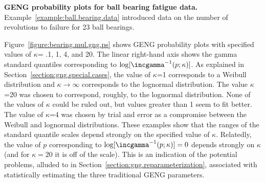 \begin{example} 
\label{example:bearing.gng.plot.compare}
{\bf GENG
probability plots for ball bearing fatigue data.} 
Example~\ref{example:ball.bearing.data} introduced data on the number of
revolutions to failure for 23 ball bearings.
\begin{sidewaysfigure}
\caption{GENG probability plots of the ball bearing
fatigue data with specified $\kappa$=
.1, 1, 4, and 20.}
\label{figure:bearing.mul.gng.ps}
\end{sidewaysfigure}
Figure~\ref{figure:bearing.mul.gng.ps} shows GENG
probability plots with specified values of $\kappa$= .1, 1, 4, and 20.
The linear right-hand axis shows the gamma standard quantiles corresponding
to $\log[\incgamma^{-1}(p;\kappa)]$.
As explained in Section~\ref{section:gng.special.cases}, the value of
$\kappa$=1 corresponds to a Weibull distribution and $\kappa \rightarrow
\infty$ corresponds to the lognormal distribution. 
The value $\kappa$=20 was chosen to
correspond, roughly, to the lognormal distribution.
None of the values of $\kappa$ could be ruled out, but values greater
than 1 seem to fit better.   The value of
$\kappa$=4 was chosen by trial and error as a compromise
between the Weibull and lognormal distributions.  These examples show
that the ranges of the standard quantile scales depend strongly on the
specified value of $\kappa$. Relatedly, the value of $p$ corresponding
to $\log[\incgamma^{-1}(p;\kappa)]=0$ depends strongly on $\kappa$
(and for $\kappa=20$ it is off of the scale). This is an indication of
the potential problems, alluded to in 
Section~\ref{section:gng.reparameterization},
associated with statistically estimating the 
three traditional GENG parameters.
\end{example}


